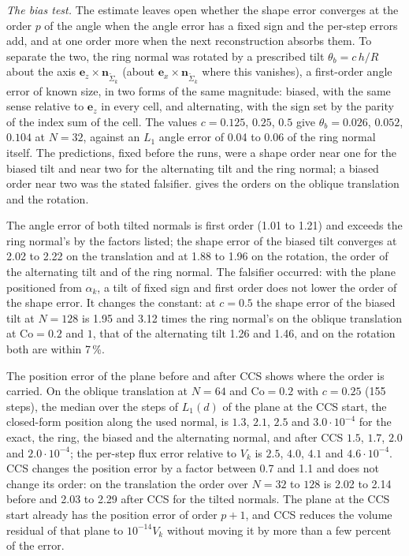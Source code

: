 \documentclass[preprint,12pt]{elsarticle}
\newcommand{\nSk}{\mathbf{n}_{\tilde{\Sigma}_k}}
\begin{document}
\emph{The bias test.} The estimate leaves open whether the shape error converges at the order $p$ of the angle when the angle error has a fixed sign and the per-step errors add, and at one order more when the next reconstruction absorbs them. To separate the two, the ring normal was rotated by a prescribed tilt $\theta_b = c\,h/R$ about the axis $\mathbf{e}_z\times\nSk$ (about $\mathbf{e}_x\times\nSk$ where this vanishes), a first-order angle error of known size, in two forms of the same magnitude: biased, with the same sense relative to $\mathbf{e}_z$ in every cell, and alternating, with the sign set by the parity of the index sum of the cell. The values $c = 0.125$, $0.25$, $0.5$ give $\theta_b = 0.026$, $0.052$, $0.104$ at $N = 32$, against an $L_1$ angle error of 0.04 to 0.06 of the ring normal itself. The predictions, fixed before the runs, were a shape order near one for the biased tilt and near two for the alternating tilt and the ring normal; a biased order near two was the stated falsifier.  gives the orders on the oblique translation and the rotation.

The angle error of both tilted normals is first order (1.01 to 1.21) and exceeds the ring normal's by the factors listed; the shape error of the biased tilt converges at 2.02 to 2.22 on the translation and at 1.88 to 1.96 on the rotation, the order of the alternating tilt and of the ring normal. The falsifier occurred: with the plane positioned from $\alpha_k$, a tilt of fixed sign and first order does not lower the order of the shape error. It changes the constant: at $c = 0.5$ the shape error of the biased tilt at $N = 128$ is 1.95 and 3.12 times the ring normal's on the oblique translation at $\mathrm{Co} = 0.2$ and $1$, that of the alternating tilt 1.26 and 1.46, and on the rotation both are within 7\,\%.

The position error of the plane before and after CCS shows where the order is carried. On the oblique translation at $N = 64$ and $\mathrm{Co} = 0.2$ with $c = 0.25$ (155 steps), the median over the steps of $L_1(d)$ of the plane at the CCS start, the closed-form position along the used normal, is $1.3$, $2.1$, $2.5$ and $3.0\cdot10^{-4}$ for the exact, the ring, the biased and the alternating normal, and after CCS $1.5$, $1.7$, $2.0$ and $2.0\cdot10^{-4}$; the per-step flux error relative to $V_k$ is $2.5$, $4.0$, $4.1$ and $4.6\cdot10^{-4}$. CCS changes the position error by a factor between 0.7 and 1.1 and does not change its order: on the translation the order over $N = 32$ to $128$ is 2.02 to 2.14 before and 2.03 to 2.29 after CCS for the tilted normals. The plane at the CCS start already has the position error of order $p + 1$, and CCS reduces the volume residual of that plane to $10^{-14}V_k$ without moving it by more than a few percent of the error.
\end{document}
